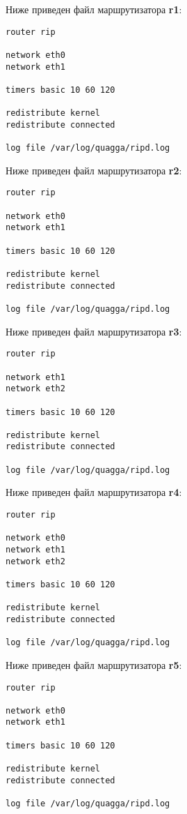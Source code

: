 \documentclass[a4paper,12pt]{article}
\begin{document}
Ниже приведен файл  маршрутизатора \textbf{r1}:

\begin{Verbatim}
router rip

network eth0
network eth1

timers basic 10 60 120

redistribute kernel
redistribute connected

log file /var/log/quagga/ripd.log
\end{Verbatim}

Ниже приведен файл  маршрутизатора \textbf{r2}:

\begin{Verbatim}
router rip

network eth0
network eth1

timers basic 10 60 120

redistribute kernel
redistribute connected

log file /var/log/quagga/ripd.log
\end{Verbatim}

Ниже приведен файл  маршрутизатора \textbf{r3}:

\begin{Verbatim}
router rip

network eth1
network eth2

timers basic 10 60 120

redistribute kernel
redistribute connected

log file /var/log/quagga/ripd.log
\end{Verbatim}

Ниже приведен файл  маршрутизатора \textbf{r4}:

\begin{Verbatim}
router rip

network eth0
network eth1
network eth2

timers basic 10 60 120

redistribute kernel
redistribute connected

log file /var/log/quagga/ripd.log
\end{Verbatim}

Ниже приведен файл  маршрутизатора \textbf{r5}:

\begin{Verbatim}
router rip

network eth0
network eth1

timers basic 10 60 120

redistribute kernel
redistribute connected

log file /var/log/quagga/ripd.log
\end{Verbatim}
\end{document}
